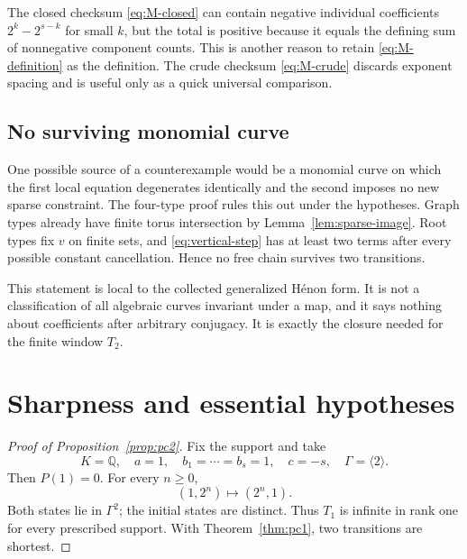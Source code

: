 \documentclass[11pt]{article}
\theoremstyle{definition}
\begin{document}
The closed checksum \eqref{eq:M-closed} can contain negative individual coefficients \(2^k-2^{s-k}\) for small \(k\), but the total is positive because it equals the defining sum of nonnegative component counts. This is another reason to retain \eqref{eq:M-definition} as the definition. The crude checksum \eqref{eq:M-crude} discards exponent spacing and is useful only as a quick universal comparison.

\subsection{No surviving monomial curve}

One possible source of a counterexample would be a monomial curve on which the first local equation degenerates identically and the second imposes no new sparse constraint. The four-type proof rules this out under the hypotheses. Graph types already have finite torus intersection by Lemma~\ref{lem:sparse-image}. Root types fix \(v\) on finite sets, and \eqref{eq:vertical-step} has at least two terms after every possible constant cancellation. Hence no free chain survives two transitions.

This statement is local to the collected generalized Hénon form. It is not a classification of all algebraic curves invariant under a map, and it says nothing about coefficients after arbitrary conjugacy. It is exactly the closure needed for the finite window \(T_2\).

\section{Sharpness and essential hypotheses}
\label{sec:sharpness}

\begin{proof}[Proof of Proposition~\ref{prop:pc2}]
Fix the support and take
\begin{equation}
 K=\mathbb Q,\quad a=1,\quad b_1=\cdots=b_s=1,\quad
 c=-s,\quad\Gamma=\langle2\rangle.
 \label{eq:pc2-data}
\end{equation}
Then \(P(1)=0\). For every \(n\geq0\),
\begin{equation}
 (1,2^n)\longmapsto(2^n,1).
 \label{eq:pc2-orbit}
\end{equation}
Both states lie in \(\Gamma^2\); the initial states are distinct. Thus \(T_1\) is infinite in rank one for every prescribed support. With Theorem~\ref{thm:pc1}, two transitions are shortest.
\end{proof}
\end{document}
